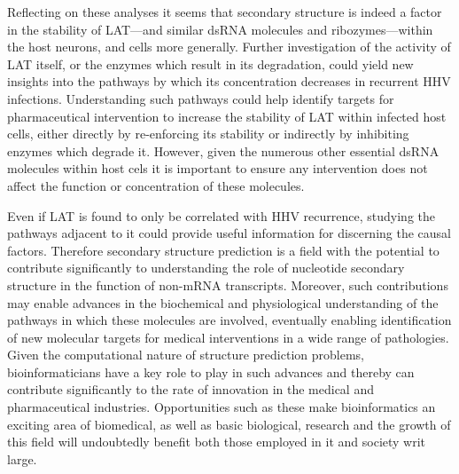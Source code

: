 \documentclass[letterpaper, 10 pt, conference]{ieeeconf}  %
\begin{document}
Reflecting on these analyses it seems that secondary structure is indeed a factor in the stability of LAT---and similar dsRNA molecules and ribozymes---within the host neurons, and cells more generally. Further investigation of the activity of LAT itself, or the enzymes which result in its degradation, could yield new insights into the pathways by which its concentration decreases in recurrent HHV infections. Understanding such pathways could help identify targets for pharmaceutical intervention to increase the stability of LAT within infected host cells, either directly by re-enforcing its stability or indirectly by inhibiting enzymes which degrade it. However, given the numerous other essential dsRNA molecules within host cels it is important to ensure any intervention does not affect the function or concentration of these molecules. 

Even if LAT is found to only be correlated with HHV recurrence, studying the pathways adjacent to it could provide useful information for discerning the causal factors. Therefore secondary structure prediction is a field with the potential to contribute significantly to understanding the role of nucleotide secondary structure in the function of non-mRNA transcripts. Moreover, such contributions may enable advances in the biochemical and physiological understanding of the pathways in which these molecules are involved, eventually enabling identification of new molecular targets for medical interventions in a wide range of pathologies. Given the computational nature of structure prediction problems, bioinformaticians have a key role to play in such advances and thereby can contribute significantly to the rate of innovation in the medical and pharmaceutical industries. Opportunities such as these make bioinformatics an exciting area of biomedical, as well as basic biological, research and the growth of this field will undoubtedly benefit both those employed in it and society writ large.

\addtolength{\textheight}{-12cm}  %
\end{document}
